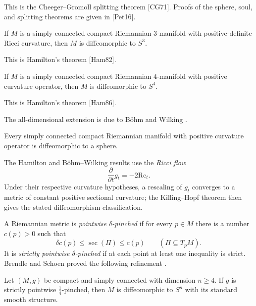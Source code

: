 This is the Cheeger--Gromoll splitting theorem [CG71]. Proofs of the sphere,
soul, and splitting theorems are given in [Pet16].

\begin{theorem}
\label{thm:hamilton-3-manifold}

If $M$ is a simply connected compact Riemannian $3$-manifold with
positive-definite Ricci curvature, then $M$ is diffeomorphic to $S^3$.
\end{theorem}

This is Hamilton's theorem [Ham82].

\begin{theorem}
\label{thm:hamilton-4-manifold}

If $M$ is a simply connected compact Riemannian $4$-manifold with positive
curvature operator, then $M$ is diffeomorphic to $S^4$.
\end{theorem}

This is Hamilton's theorem [Ham86].

The all-dimensional extension is due to Böhm and Wilking \cite{BW08}.

\begin{theorem}
\label{thm:bohm-wilking}

Every simply connected compact Riemannian manifold with positive curvature
operator is diffeomorphic to a sphere.
\end{theorem}

The Hamilton and Böhm--Wilking results use the \emph{Ricci flow}
\[
\frac{\partial}{\partial t}g_t=-2\mathrm{Rc}_t.
\]
Under their respective curvature hypotheses, a rescaling of $g_t$ converges
to a metric of constant positive sectional curvature; the Killing--Hopf
theorem then gives the stated diffeomorphism classification.

A Riemannian metric is \emph{pointwise $\delta$-pinched} if for every
$p\in M$ there is a number $c(p)>0$ such that
\[
\delta c(p)\leq\sec(\Pi)\leq c(p)
\qquad(\Pi\subseteq T_pM).
\]
It is \emph{strictly pointwise $\delta$-pinched} if at each point at least
one inequality is strict. Brendle and Schoen proved the following refinement
\cite{BS09}.

\begin{theorem}
\label{thm:differentiable-sphere-theorem}

Let $(M,g)$ be compact and simply connected with dimension $n\geq4$. If $g$
is strictly pointwise $\frac14$-pinched, then $M$ is diffeomorphic to $S^n$
with its standard smooth structure.
\end{theorem}


